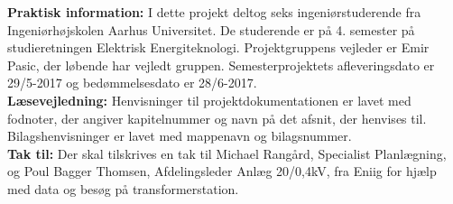 


\textbf{Praktisk information:} I dette projekt deltog seks ingeniørstuderende fra Ingeniørhøjskolen Aarhus Universitet. De studerende er på 4. semester på studieretningen Elektrisk Energiteknologi. Projektgruppens vejleder er Emir Pasic, der løbende har vejledt gruppen. Semesterprojektets afleveringsdato er 29/5-2017 og bedømmelsesdato er 28/6-2017. \\
\textbf{Læsevejledning:} Henvisninger til projektdokumentationen er lavet med fodnoter, der angiver kapitelnummer og navn på det afsnit, der henvises til. Bilagshenvisninger er lavet med mappenavn og bilagsnummer. \\
\textbf{Tak til:} Der skal tilskrives en tak til Michael Rangård, Specialist Planlægning, og Poul Bagger Thomsen, Afdelingsleder Anlæg 20/0,4kV, fra Eniig for hjælp med data og besøg på transformerstation.
